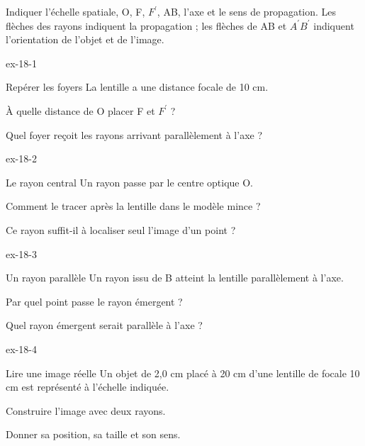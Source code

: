 \begin{savoirfaire}Indiquer l'échelle spatiale, O, F, $F^{\prime}$, AB, l'axe et le sens de propagation. Les flèches des rayons indiquent la propagation ; les flèches de AB et $A^{\prime}B^{\prime}$ indiquent l'orientation de l'objet et de l'image.\end{savoirfaire}
\exercices
{}
\begin{blocLivre}{ex-18-1}\begin{exercice}[1]{Repérer les foyers}
La lentille a une distance focale de 10 cm.
\begin{questions}
\item À quelle distance de O placer F et $F^{\prime}$ ?
\item Quel foyer reçoit les rayons arrivant parallèlement à l’axe ?
\end{questions}
\end{exercice}\end{blocLivre}
\begin{blocLivre}{ex-18-2}\begin{exercice}[1]{Le rayon central}
Un rayon passe par le centre optique O.
\begin{questions}
\item Comment le tracer après la lentille dans le modèle mince ?
\item Ce rayon suffit-il à localiser seul l’image d’un point ?
\end{questions}
\end{exercice}\end{blocLivre}
\begin{blocLivre}{ex-18-3}\begin{exercice}[1]{Un rayon parallèle}
Un rayon issu de B atteint la lentille parallèlement à l’axe.
\begin{questions}
\item Par quel point passe le rayon émergent ?
\item Quel rayon émergent serait parallèle à l’axe ?
\end{questions}
\end{exercice}\end{blocLivre}
\begin{blocLivre}{ex-18-4}\begin{exercice}[1]{Lire une image réelle}
Un objet de 2,0 cm placé à 20 cm d’une lentille de focale 10 cm est représenté à l’échelle indiquée.
\begin{questions}
\item Construire l’image avec deux rayons.
\item Donner sa position, sa taille et son sens.
\end{questions}
\end{exercice}\end{blocLivre}
